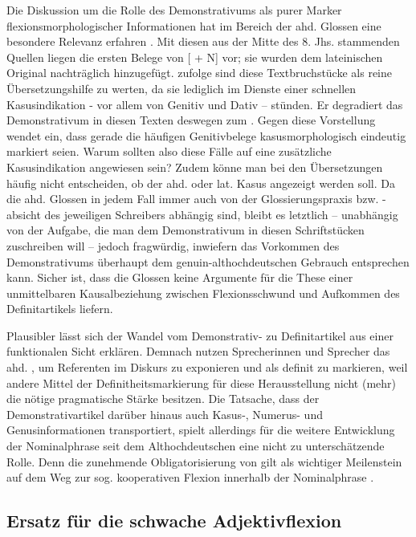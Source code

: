 Die Diskussion um die Rolle des Demonstrativums als purer Marker flexionsmorphologischer Informationen hat im Bereich der ahd. Glossen eine besondere Relevanz erfahren \parencite{Glaser2000}. Mit diesen aus der Mitte des 8. Jhs. stammenden Quellen liegen die ersten Belege von [ + N] vor; sie wurden dem lateinischen Original nachträglich  hinzugefügt. \textcite[12]{Hodler1954} zufolge sind diese Textbruchstücke als reine Übersetzungshilfe zu werten, da sie lediglich im Dienste einer schnellen Kasusindikation - vor allem von Genitiv und Dativ -- stünden. Er degradiert das Demonstrativum in diesen Texten deswegen zum  \parencite[12]{Hodler1954}. Gegen diese Vorstellung wendet \textcite[209f.]{Glaser2000} ein, dass  gerade die häufigen Genitivbelege kasusmorphologisch eindeutig markiert seien. Warum sollten also diese Fälle auf eine zusätzliche Kasusindikation angewiesen sein? Zudem könne man bei den Übersetzungen häufig nicht entscheiden, ob der ahd. oder lat. Kasus angezeigt werden soll. Da die ahd. Glossen in jedem Fall immer auch von der Glossierungspraxis bzw. -absicht des jeweiligen Schreibers abhängig sind, bleibt es letztlich  -- unabhängig von der Aufgabe, die man dem Demonstrativum in diesen Schriftstücken zuschreiben will -- jedoch fragwürdig, inwiefern das Vorkommen des Demonstrativums überhaupt dem genuin-althochdeutschen Gebrauch entsprechen kann. Sicher ist, dass die Glossen keine Argumente für die These einer unmittelbaren Kausalbeziehung zwischen Flexionsschwund und Aufkommen des Definitartikels liefern.

Plausibler lässt sich der Wandel vom Demonstrativ- zu Definitartikel aus einer funktionalen Sicht erklären. Demnach nutzen Sprecherinnen und Sprecher das ahd. , um Referenten im Diskurs zu exponieren und als definit zu markieren, weil andere Mittel der Definitheitsmarkierung für diese Herausstellung nicht (mehr) die nötige pragmatische Stärke besitzen. Die Tatsache, dass der Demonstrativartikel darüber hinaus auch Kasus-, Numerus- und Genusinformationen transportiert, spielt allerdings für die weitere Entwicklung  der Nominalphrase seit dem Althochdeutschen eine nicht zu unterschätzende Rolle. Denn die zunehmende Obligatorisierung von  gilt als wichtiger Meilenstein auf dem Weg zur sog. kooperativen Flexion innerhalb der Nominalphrase \parencite[s. u.a.][]{Ronneberger-Sibold2010a,Szczepaniak2010}.
 
\subsection{Ersatz für die schwache Adjektivflexion} \label{ersatz-schwach}

